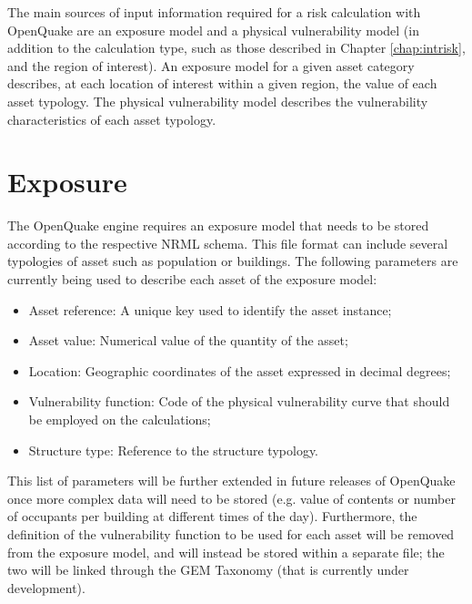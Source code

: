 The main sources of input information required for a risk calculation with OpenQuake are an exposure model and a physical vulnerability model (in addition to the calculation type, such as those described in Chapter \ref{chap:intrisk}, and the region of interest). An exposure model for a given asset category describes, at each location of interest within a given region, the value of each asset typology. The physical vulnerability model describes the vulnerability characteristics of each asset typology.
\section{Exposure}
The OpenQuake engine requires an exposure model that needs to be stored according to the respective NRML schema. This file format can include several typologies of asset such as population or buildings. The following parameters are currently being used to describe each asset of the exposure model: 

\begin{itemize}
\item Asset reference: A unique key used to identify the asset instance;
\item Asset value: Numerical value of the quantity of the asset;
\item Location: Geographic coordinates of the asset expressed in decimal degrees;
\item Vulnerability function: Code of the physical vulnerability curve that should be employed on the calculations;
\item Structure type: Reference to the structure typology.
\end{itemize}

This list of parameters will be further extended in future releases of OpenQuake once more complex data will need to be stored (e.g. value of contents or number of occupants per building at different times of the day).  Furthermore, the definition of the vulnerability function to be used for each asset will be removed from the exposure model, and will instead be stored within a separate file; the two will be linked through the GEM Taxonomy (that is currently under development).

